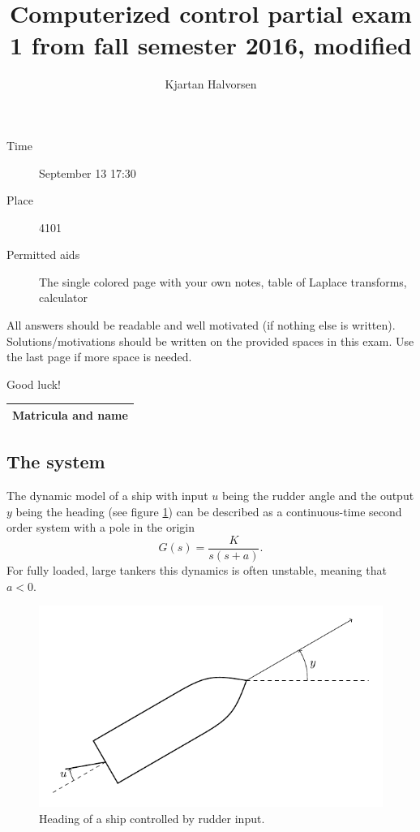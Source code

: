 \documentclass[a4paper,12pt]{article}
\title{Computerized control partial exam 1 from fall semester 2016, modified}
\author{Kjartan Halvorsen}
\newcommand{\bmpl}{\begin{minipage}[t]{140mm}}
\newcommand{\emp}{\end{minipage}}
\begin{document}
\maketitle


\begin{description}
\item[Time] September 13 17:30
\item[Place] 4101
\item[Permitted aids] The single colored page with your own notes, table of Laplace transforms, calculator
\end{description}

All answers should be readable and well motivated (if nothing else is written). Solutions/motivations should be written on the provided spaces in this exam. Use the last page if more space is needed.

\begin{center}
{\Large Good luck!} \\
\end{center}

\begin{tabular}{|l|l|}
\hline
\multicolumn{2}{|l|}{\bmpl
Matricula and name
\vspace*{18mm}
\emp}\\
\hline

\end{tabular}

\clearpage

\subsection*{The system}
The dynamic model of a ship with input $u$ being the rudder angle and the output $y$ being the heading (see figure \ref{fig:tanker}) can be described as a continuous-time second order system with a pole in the origin
\[ G(s) = \frac{K}{s(s + a)}. \]
For fully loaded, large tankers this dynamics is often unstable, meaning that $a<0$.  
\begin{figure}[h]
\begin{center}
\includegraphics[width=0.8\linewidth]{tanker}
\caption{Heading of a ship controlled by rudder input.}
\label{fig:tanker}
\end{center}
\end{figure}
\end{document}

